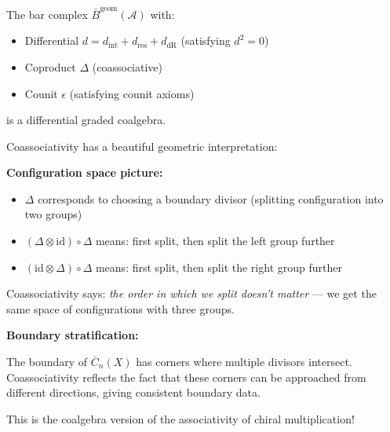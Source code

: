 \begin{corollary}\label{cor:bar-is-dgcoalg}
The bar complex $\bar{B}^{\text{geom}}(\mathcal{A})$ with:
\begin{itemize}
\item Differential $d = d_{\text{int}} + d_{\text{res}} + d_{\text{dR}}$ (satisfying $d^2 = 0$)
\item Coproduct $\Delta$ (coassociative)
\item Counit $\epsilon$ (satisfying counit axioms)
\end{itemize}
is a differential graded coalgebra.
\end{corollary}

\begin{remark}\label{rem:coassoc-geometric}
Coassociativity has a beautiful geometric interpretation:

\textbf{Configuration space picture:}
\begin{itemize}
\item $\Delta$ corresponds to choosing a boundary divisor (splitting configuration into two groups)
\item $(\Delta \otimes \text{id}) \circ \Delta$ means: first split, then split the left group further
\item $(\text{id} \otimes \Delta) \circ \Delta$ means: first split, then split the right group further
\end{itemize}

Coassociativity says: \emph{the order in which we split doesn't matter} — we get the same space of configurations with three groups.

\textbf{Boundary stratification:}

The boundary of $\overline{C}_n(X)$ has corners where multiple divisors intersect. Coassociativity reflects the fact that these corners can be approached from different directions, giving consistent boundary data.

This is the coalgebra version of the associativity of chiral multiplication!
\end{remark}

